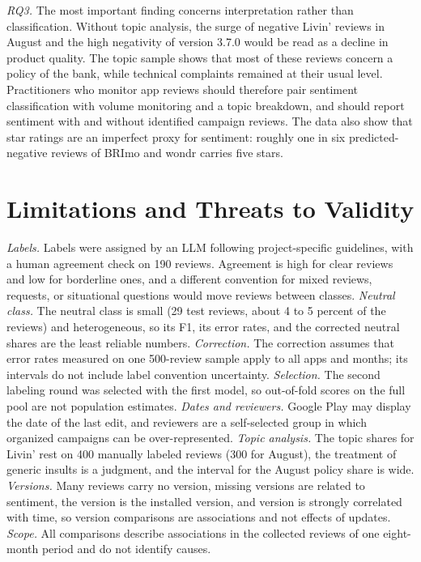 \documentclass[conference]{IEEEtran}
\begin{document}
\textit{RQ3.} The most important finding concerns interpretation rather than classification. Without topic analysis, the surge of negative Livin' reviews in August and the high negativity of version 3.7.0 would be read as a decline in product quality. The topic sample shows that most of these reviews concern a policy of the bank, while technical complaints remained at their usual level. Practitioners who monitor app reviews should therefore pair sentiment classification with volume monitoring and a topic breakdown, and should report sentiment with and without identified campaign reviews. The data also show that star ratings are an imperfect proxy for sentiment: roughly one in six predicted-negative reviews of BRImo and wondr carries five stars.

\section{Limitations and Threats to Validity}\label{sec:limits}
\textit{Labels.} Labels were assigned by an LLM following project-specific guidelines, with a human agreement check on 190 reviews. Agreement is high for clear reviews and low for borderline ones, and a different convention for mixed reviews, requests, or situational questions would move reviews between classes. \textit{Neutral class.} The neutral class is small (29 test reviews, about 4 to 5 percent of the reviews) and heterogeneous, so its F1, its error rates, and the corrected neutral shares are the least reliable numbers. \textit{Correction.} The correction assumes that error rates measured on one 500-review sample apply to all apps and months; its intervals do not include label convention uncertainty. \textit{Selection.} The second labeling round was selected with the first model, so out-of-fold scores on the full pool are not population estimates. \textit{Dates and reviewers.} Google Play may display the date of the last edit, and reviewers are a self-selected group in which organized campaigns can be over-represented. \textit{Topic analysis.} The topic shares for Livin' rest on 400 manually labeled reviews (300 for August), the treatment of generic insults is a judgment, and the interval for the August policy share is wide. \textit{Versions.} Many reviews carry no version, missing versions are related to sentiment, the version is the installed version, and version is strongly correlated with time, so version comparisons are associations and not effects of updates. \textit{Scope.} All comparisons describe associations in the collected reviews of one eight-month period and do not identify causes.
\end{document}
